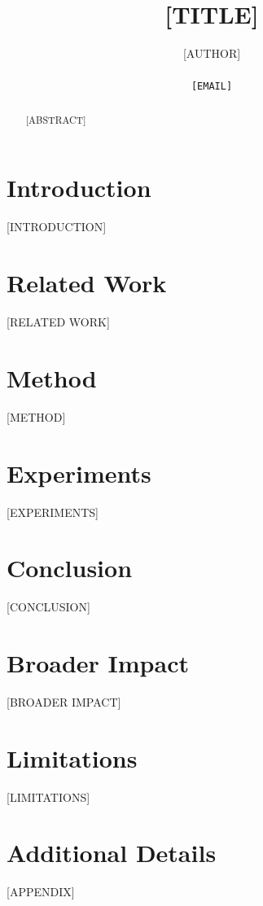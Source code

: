 \documentclass[10pt]{article}
\title{[TITLE]}
\author{[AUTHOR] \\
  [AFFILIATION] \\
  \texttt{[EMAIL]}
}
\theoremstyle{plain}
\theoremstyle{definition}
\theoremstyle{remark}
\begin{document}
\maketitle

\begin{abstract}
[ABSTRACT]
\end{abstract}

\section{Introduction}
\label{sec:intro}
[INTRODUCTION]

\section{Related Work}
\label{sec:related}
[RELATED WORK]

\section{Method}
\label{sec:method}
[METHOD]

\section{Experiments}
\label{sec:experiments}
[EXPERIMENTS]

\section{Conclusion}
\label{sec:conclusion}
[CONCLUSION]

\section*{Broader Impact}
[BROADER IMPACT]

\section*{Limitations}
[LIMITATIONS]




\appendix
\section{Additional Details}
[APPENDIX]
\end{document}

